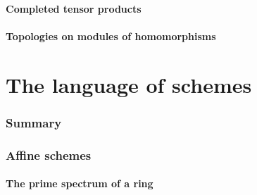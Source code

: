 \documentclass{book}
\begin{document}
        \label{0-prelim-7.6}

        



        \subsection{Completed tensor products}

        \label{0-prelim-7.7}

        



        \subsection{Topologies on modules of homomorphisms}

        \label{0-prelim-7.8}

        



\clearpage



\setcounter{subsection}{0}

\part{The language of schemes}

    

    \section*{Summary}

    \label{1-schemes.summary}

    



    \section{Affine schemes}

       

        \subsection{The prime spectrum of a ring}

        
\end{document}
